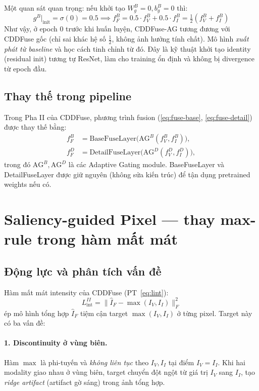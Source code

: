 Một quan sát quan trọng: nếu khởi tạo $W_g^B = 0, b_g^B = 0$ thì:
\begin{equation}
g^B \big|_{\text{init}} = \sigma(0) = 0.5 \implies f_F^B = 0.5 \cdot f_V^B + 0.5 \cdot f_I^B = \tfrac{1}{2}(f_V^B + f_I^B)
\end{equation}
Như vậy, ở epoch 0 trước khi huấn luyện, CDDFuse-AG tương đương với CDDFuse gốc (chỉ sai khác hệ số $\tfrac{1}{2}$, không ảnh hưởng tính chất). Mô hình \emph{xuất phát từ baseline} và học cách tinh chỉnh từ đó. Đây là kỹ thuật khởi tạo identity (residual init) tương tự ResNet, làm cho training ổn định và không bị divergence từ epoch đầu.

\subsection{Thay thế trong pipeline}

Trong Pha II của CDDFuse, phương trình fusion (\ref{eq:fuse-base}, \ref{eq:fuse-detail}) được thay thế bằng:
\begin{align}
f_F^B &= \mathrm{BaseFuseLayer}\big(\mathrm{AG}^B(f_V^B, f_I^B)\big), \\
f_F^D &= \mathrm{DetailFuseLayer}\big(\mathrm{AG}^D(f_V^D, f_I^D)\big),
\end{align}
trong đó $\mathrm{AG}^B, \mathrm{AG}^D$ là các Adaptive Gating module. BaseFuseLayer và DetailFuseLayer được giữ nguyên (không sửa kiến trúc) để tận dụng pretrained weights nếu có.

\section{Saliency-guided Pixel --- thay max-rule trong hàm mất mát}
\label{sec:moduleB}

\subsection{Động lực và phân tích vấn đề}

Hàm mất mát intensity của CDDFuse (PT~\ref{eq:lint}):
\begin{equation*}
L_{\mathrm{int}}^{II} = \|\hat{I}_F - \max(I_V, I_I)\|_F^2
\end{equation*}
ép mô hình tổng hợp $\hat{I}_F$ tiệm cận target $\max(I_V, I_I)$ ở từng pixel. Target này có ba vấn đề:

\paragraph{1. Discontinuity ở vùng biên.}
Hàm $\max$ là phi-tuyến và \emph{không liên tục} theo $I_V, I_I$ tại điểm $I_V = I_I$. Khi hai modality giao nhau ở vùng biên, target chuyển đột ngột từ giá trị $I_V$ sang $I_I$, tạo \emph{ridge artifact} (artifact gờ sáng) trong ảnh tổng hợp.

